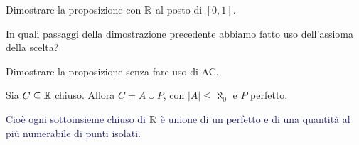 \begin{exercise}
	Dimostrare la proposizione con $\mathbb R$ al posto di $[0,1]$.
\end{exercise}

\begin{exercise}
	In quali passaggi della dimostrazione precedente abbiamo fatto uso dell'assioma della scelta?
\end{exercise}

\begin{exercise}
	Dimostrare la proposizione senza fare uso di AC.
\end{exercise}

\begin{theorem}
	\label{Cantor_Bendixson}
	Sia $C \subseteq \mathbb R$ chiuso. Allora $C = A \cup P$, con $|A| \leq \aleph_0$ e $P$ perfetto.
\end{theorem}

\textcolor{MidnightBlue}{Cio\`e ogni sottoinsieme chiuso di $\mathbb R$ \`e unione di un perfetto e di una quantit\`a al pi\`u numerabile di punti isolati.}

